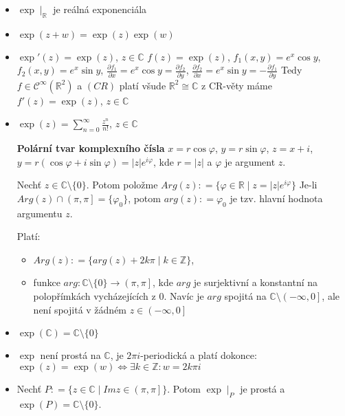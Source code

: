 \begin{properties}
\begin{itemize}
    \item $\exp \mid_{  \mathbb{R}}$ je reálná exponenciála 
    \item $\exp(z+w)=\exp(z)\exp(w)$
    \item $\exp'(z)=\exp(z)$, $ z \in\mathbb{C}$
     \newline
     $f(z)=\exp(z)$, $f_1(x,y)=e^x \cos y$, $ f_2(x,y)=e^x\sin y$, 
     \newline
     $\frac{\partial f_1}{\partial x} = e^x\cos y = \frac{\partial f_2}{\partial y}$, $
     \frac{\partial f_2}{\partial x} = e^x \sin y= - \frac{\partial f_1}{\partial y}$
     \newline Tedy $f\in\mathcal{C}^{\infty}(\mathbb{R}^2)$ a $(CR)$ platí všude $\mathbb{R}^2\cong\mathbb{C}$ z CR-věty máme $f'(z)=\exp(z)$, $z\in\mathbb{C}$
     \item $\exp(z)=\sum_{n=0}^{\infty}\frac{z^n}{n!}$, $z\in\mathbb{C}$
     \newline
     
     \textbf{Polární tvar komplexního čísla}
       $ x=r\cos \varphi$, $
        y=r\sin \varphi$, $
        z=x+i$, $ y=r(\cos \varphi + i \sin \varphi)=\lvert z \rvert e^{i\varphi} $, kde $r=\lvert z \rvert$ a $\varphi$ je argument $z$.
    
     
     \begin{notation}
          Nechť $z\in\mathbb{C}\setminus\{0\}$. Potom položme $Arg(z)\colon=\{\varphi\in\mathbb{R}\mid z=\lvert z \rvert e^{i\varphi}\}$ Je-li $Arg(z) \cap \left (\pi,\pi\right ]=\{\varphi_0\}$, potom $arg(z)\colon=\varphi_0$ je tzv. hlavní hodnota argumentu $z$. 
     \end{notation}
     
         Platí: 
        \begin{itemize}
            \item $Arg(z)\colon = \{arg(z)+2k\pi\mid k\in\mathbb{Z}\}$,
            \item funkce $arg\colon \mathbb {C}\setminus\{0\} \to \left (\pi,\pi\right ]$, kde $arg$ je surjektivní a  konstantní na polopřímkách vycházejících z $0$. Navíc je $arg$ spojitá na $\mathbb {C}\setminus\left (-\infty,0\right ]$, ale není spojitá v žádném $z\in \left (-\infty,0\right ]$
        \end{itemize}

     \item $\exp(\mathbb{C})=\mathbb{C}\setminus\{0\}$ 
     \item $\exp$ není prostá na $\mathbb{C}$, je $2\pi i$-periodická a platí dokonce:
     \newline
    $\exp(z) =\exp(w) \iff\exists k \in\mathbb{Z}\colon w=2k\pi i$
     \item Nechť $P\colon=\{z\in\mathbb{C}\mid Im z \in \left (\pi,\pi\right ]\}$.
     Potom $\exp{}\mid_P$ je prostá a $\exp(P)=\mathbb{C}\setminus\{0\}$.
\end{itemize}
\end{properties}

